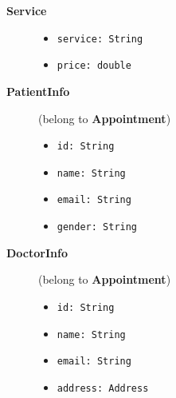 \begin{description}
	\item[\textbf{Service}]
	\hfill
	\begin{itemize}
		\item \texttt{service: String}  
		\item \texttt{price: double}  
	\end{itemize}
	
	\item[\textbf{PatientInfo}] (belong to \textbf{Appointment})
	\hfill
	\begin{itemize}
		\item \texttt{id: String}  
		\item \texttt{name: String}  
		\item \texttt{email: String}  
		\item \texttt{gender: String}  
	\end{itemize}
	
	\item[\textbf{DoctorInfo}] (belong to \textbf{Appointment})
	\hfill
	\begin{itemize}
		\item \texttt{id: String}  
		\item \texttt{name: String}  
		\item \texttt{email: String}  
		\item \texttt{address: Address}  
	\end{itemize}
\end{description}
